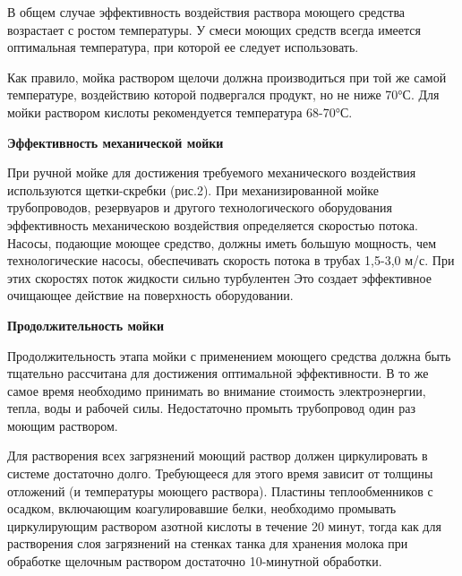 \documentclass[a4paper,12pt,oneside]{extarticle}
\begin{document}
	 	\begin{flushleft}
	 	В общем случае эффективность воздействия раствора моющего средства возрастает с ростом температуры. У смеси моющих средств всегда имеется оптимальная температура, при которой ее следует использовать.
	 \end{flushleft}
	 
	 
	 	\begin{flushleft}
	 	Как правило, мойка раствором щелочи должна производиться при той же самой температуре, воздействию которой подвергался продукт, но не ниже 70°С. Для мойки раствором кислоты рекомендуется температура 68-70°С.
	 \end{flushleft}
	 
	 \begin{flushleft}
	 	\bfseries 	Эффективность механической мойки
	 \end{flushleft}	
	 
	 
	 	\begin{flushleft}
	 При ручной мойке для достижения требуемого механического воздействия используются щетки-скребки (рис.2). При механизированной мойке трубопроводов, резервуаров и другого технологического оборудования эффективность механическою воздействия определяется скоростью потока. Насосы, подающие моющее средство, должны иметь большую мощность, чем технологические насосы, обеспечивать скорость потока в трубах 1,5-3,0 м/с. При этих скоростях поток жидкости сильно турбулентен Это создает эффективное очищающее действие на поверхность оборудовании.
	 \end{flushleft}
	 
	 
	 
	 \begin{flushleft}
	 	\bfseries Продолжительность мойки
	 \end{flushleft}	
	 
	 	\begin{flushleft}
	 	Продолжительность этапа мойки с применением моющего средства должна быть тщательно рассчитана для достижения оптимальной эффективности. В то же самое время необходимо принимать во внимание стоимость электроэнергии, тепла, воды и рабочей силы. Недостаточно промыть трубопровод один раз моющим раствором.
	 \end{flushleft}
	 
	 
	 	\begin{flushleft}
	 	Для растворения всех загрязнений моющий раствор должен циркулировать в системе достаточно долго. Требующееся для этого время зависит от толщины отложений (и температуры моющего раствора). Пластины теплообменников с осадком, включающим коагулировавшие белки, необходимо промывать циркулирующим раствором азотной кислоты в течение 20 минут, тогда как для растворения слоя загрязнений на стенках танка для хранения молока при обработке щелочным раствором достаточно 10-минутной обработки.
	 \end{flushleft}
	 
\end{document}
